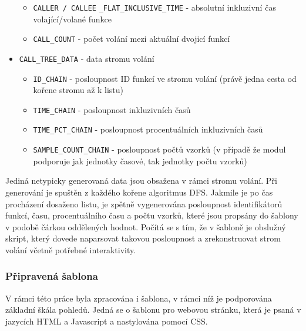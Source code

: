 \documentclass[czech,BP]{thesiskiv}
\begin{document}
\begin{itemize}
\begin{itemize}
	\item \texttt{CALLER / CALLEE} \texttt{\_FLAT\_INCLUSIVE\_TIME} - absolutní inkluzivní čas volající/volané funkce
	\item \texttt{CALL\_COUNT} - počet volání mezi aktuální dvojicí funkcí
	\end{itemize}
\item \texttt{CALL\_TREE\_DATA} - data stromu volání
	\begin{itemize}
	\item \texttt{ID\_CHAIN} - posloupnost ID funkcí ve stromu volání (právě jedna cesta od kořene stromu až k listu)
	\item \texttt{TIME\_CHAIN} - posloupnost inkluzivních časů
	\item \texttt{TIME\_PCT\_CHAIN} - posloupnost procentuálních inkluzivních časů
	\item \texttt{SAMPLE\_COUNT\_CHAIN} - posloupnost počtů vzorků (v případě že modul podporuje jak jednotky časové, tak jednotky počtu vzorků)
	\end{itemize}
\end{itemize}

Jediná netypicky generovaná data jsou obsažena v rámci stromu volání. Při generování je spuštěn z každého kořene algoritmus DFS. Jakmile je po čas procházení dosaženo listu, je zpětně vygenerována posloupnost identifikátorů funkcí, času, procentuálního času a počtu vzorků, které jsou propsány do šablony v podobě čárkou oddělených hodnot. Počítá se s tím, že v šabloně je obslužný skript, který dovede naparsovat takovou posloupnost a zrekonstruovat strom volání včetně potřebné interaktivity.

\subsubsection*{Připravená šablona}

V rámci této práce byla zpracována i šablona, v rámci níž je podporována základní škála pohledů. Jedná se o šablonu pro webovou stránku, která je psaná v jazycích HTML a Javascript a nastylována pomocí CSS.
\end{document}
